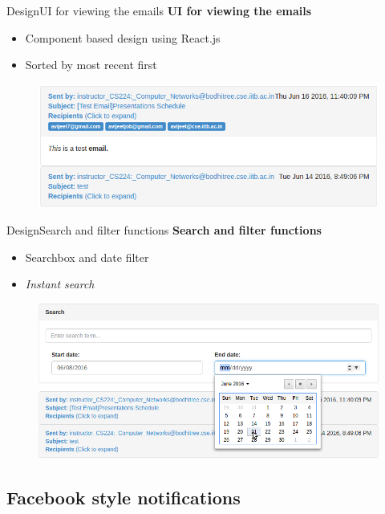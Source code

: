 \documentclass[xcolor=table]{beamer}
\begin{document}
\begin{frame}{Design}{UI for viewing the emails}
	\textbf{UI for viewing the emails}
	\begin{itemize}
		\item Component based design using React.js
		\item Sorted by most recent first
	\end{itemize}
	\begin{figure}
		\centering
		\includegraphics[width=0.8\linewidth]{media/email_ui} \\
		\label{fig:email_ui}
	\end{figure}
\end{frame}

\begin{frame}{Design}{Search and filter functions}
	\textbf{Search and filter functions}
	\begin{itemize}
		\item Searchbox and date filter
		\item \textit{Instant search}
	\end{itemize}
	\begin{figure}
		\centering
		\includegraphics[width=0.8\linewidth]{media/email_search} \\
		\label{fig:email_search}
	\end{figure}
\end{frame}

\subsection{Facebook style notifications}
\end{document}
